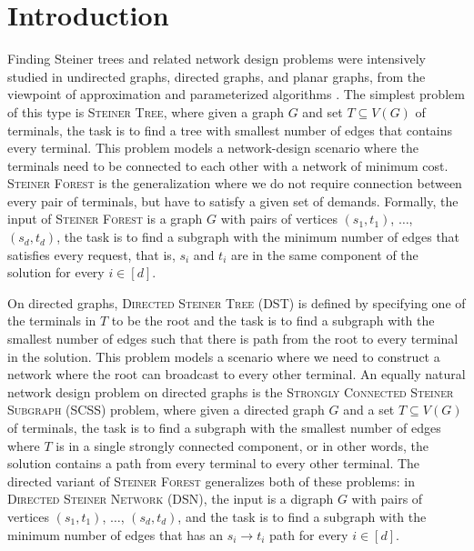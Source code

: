 \section{Introduction}\label{sec:introduction}

Finding Steiner trees and related network design problems were intensively studied in undirected graphs, directed graphs, and planar graphs, from the viewpoint of approximation and parameterized algorithms \cite{ChitnisFHM20,eiben_et_al,DBLP:conf/stacs/DvorakFKMTV18,rajesh-andreas-pasin,khandekar,FeldmannM16,DBLP:journals/iandc/BermanBMRY13,DBLP:journals/siamdm/GuoNS11,feldman-ruhl,DBLP:journals/jal/CharikarCCDGGL99,winter1987steiner,hakimi,DBLP:journals/jacm/BateniHM11,DBLP:conf/soda/BateniCEHKM11,DBLP:conf/focs/MarxPP18,karp1972reducibility,ramanathan1996multicast,salama1997evaluation,Li1992267,Natu1997207,daniel-grid-tiling,levin}. The simplest problem of this type is \textsc{Steiner Tree}, where given a graph $G$ and set $T\subseteq V(G)$ of terminals, the task is to find a tree with smallest number of edges that contains every terminal. This problem models a network-design scenario where the terminals need to be connected to each other with a network of minimum cost. \textsc{Steiner Forest} is the generalization where we do not require connection between every pair of terminals, but have to satisfy a given set of demands. Formally, the input of \textsc{Steiner Forest} is a graph $G$ with pairs of vertices $(s_1,t_1)$, $\dots$, $(s_d,t_d)$, the task is to find a subgraph with the minimum number of edges that satisfies every request, that is, $s_i$ and $t_i$ are in the same component of the solution for every $i\in [d]$. 

On directed graphs, \textsc{Directed Steiner Tree (DST)} is defined by specifying one of the terminals in $T$ to be the root and the task is to find a subgraph with the smallest number of edges such that there is path from the root to every terminal in the solution. This problem models a scenario where we need to construct a network where the root can broadcast to every other terminal. An equally natural network design problem on directed graphs is the \textsc{Strongly Connected Steiner Subgraph (SCSS)} problem, where given a directed graph $G$ and a set $T\subseteq V(G)$ of terminals, the task is to find a subgraph with the smallest number of edges where $T$ is in a single strongly connected component, or in other words, the solution contains a path from every terminal to every other terminal. The directed variant of \textsc{Steiner Forest} generalizes both of these problems: in \textsc{Directed Steiner Network (DSN)}, the
input is a digraph $G$ with pairs of vertices $(s_1,t_1)$, $\dots$, $(s_d,t_d)$, and the task is to find a subgraph with the minimum number of edges that has an $s_i\to t_i$ path for every $i\in [d]$.

